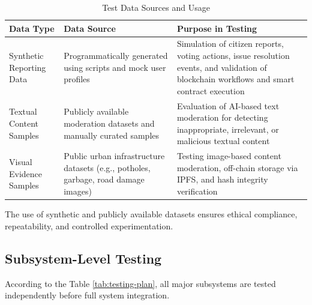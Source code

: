 \begin{table}[h!]
\centering
\small
\renewcommand{\arraystretch}{1.4}
\caption{Test Data Sources and Usage}
\label{tab:data-acquisition}
\begin{tabular}{|p{4cm}|p{4cm}|p{5cm}|}
\hline
\textbf{Data Type} & \textbf{Data Source} & \textbf{Purpose in Testing} \\ \hline

Synthetic Reporting Data &
Programmatically generated using scripts and mock user profiles &
Simulation of citizen reports, voting actions, issue resolution events, and validation of blockchain workflows and smart contract execution \\ \hline

Textual Content Samples &
Publicly available moderation datasets and manually curated samples &
Evaluation of AI-based text moderation for detecting inappropriate, irrelevant, or malicious textual content \\ \hline

Visual Evidence Samples &
Public urban infrastructure datasets (e.g., potholes, garbage, road damage images) &
Testing image-based content moderation, off-chain storage via IPFS, and hash integrity verification \\ \hline

\end{tabular}
\end{table}


The use of synthetic and publicly available datasets ensures ethical compliance,
repeatability, and controlled experimentation.

\subsection{Subsystem-Level Testing}

According to the Table \ref{tab:testing-plan}, all major subsystems are tested independently before full system integration.

